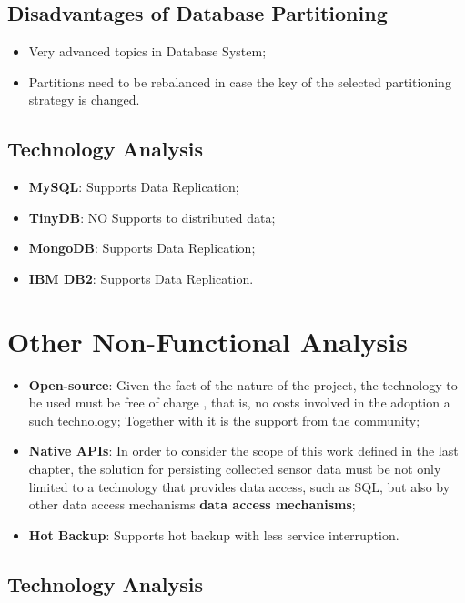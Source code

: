 \subsection{Disadvantages of Database Partitioning}

\begin{itemize}
  \item Very advanced topics in Database System;
  \item Partitions need to be rebalanced in case the key of the selected 
  partitioning strategy is changed.
\end{itemize}

\subsection{Technology Analysis}

\begin{itemize}
  \item \textbf{MySQL}: Supports Data Replication;
  \item \textbf{TinyDB}: NO Supports to distributed data;
  \item \textbf{MongoDB}: Supports Data Replication;
  \item \textbf{IBM DB2}: Supports Data Replication.
\end{itemize}

\section{Other Non-Functional Analysis}

\begin{itemize}
  \item \textbf{Open-source}: Given the fact of the nature of the project, the
  technology to be used must be free of charge \cite{open-source}, that is, no
  costs involved in the adoption a such technology; Together with it is the
  support from the community;
  \item \textbf{Native APIs}: In order to consider the scope of this work
  defined in the last chapter, the solution for persisting collected sensor
  data must be not only limited to a technology that provides data access, such
  as SQL, but also by other data access mechanisms \textbf{data access
  mechanisms};
  \item \textbf{Hot Backup}: Supports hot backup with less service interruption. 
\end{itemize}

\subsection{Technology Analysis}

